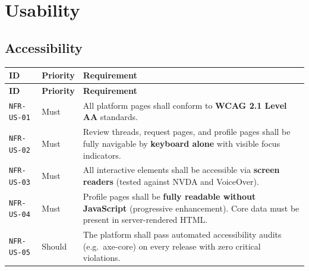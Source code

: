\documentclass[12pt,a4paper]{article}
\begin{document}
\section{Usability}

\subsection{Accessibility}
\begin{longtable}{L{2.2cm} L{1.8cm} L{9.3cm}}
  \color{white}\bfseries ID & \color{white}\bfseries Priority & \color{white}\bfseries Requirement \\
  \endfirsthead
  \color{white}\bfseries ID & \color{white}\bfseries Priority & \color{white}\bfseries Requirement \\
  \endhead\hline
  \texttt{NFR-US-01} & Must   & All platform pages shall conform to \textbf{WCAG 2.1 Level AA} standards. \\
  \texttt{NFR-US-02} & Must   & Review threads, request pages, and profile pages shall be fully navigable by \textbf{keyboard alone} with visible focus indicators. \\
  \texttt{NFR-US-03} & Must   & All interactive elements shall be accessible via \textbf{screen readers} (tested against NVDA and VoiceOver). \\
  \texttt{NFR-US-04} & Must   & Profile pages shall be \textbf{fully readable without JavaScript} (progressive enhancement). Core data must be present in server-rendered HTML. \\
  \texttt{NFR-US-05} & Should & The platform shall pass automated accessibility audits (e.g.\ axe-core) on every release with zero critical violations. \\
  \hline
\end{longtable}
\end{document}
